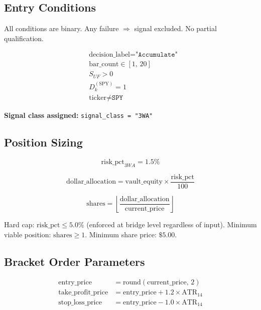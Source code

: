 \documentclass[11pt, a4paper]{article}
\begin{document}
\subsection{Entry Conditions}

All conditions are binary. Any failure $\Rightarrow$ signal excluded. No partial
qualification.

\begin{align}
  &\text{decision\_label} = \texttt{"Accumulate"} \label{eq:3wa-1}\\
  &\text{bar\_count} \in [1,\, 20] \label{eq:3wa-2}\\
  &S_{UF} > 0 \label{eq:3wa-3}\\
  &D_k^{(\text{SPY})} = 1 \label{eq:3wa-4}\\
  &\text{ticker} \neq \texttt{SPY} \label{eq:3wa-5}
\end{align}

\textbf{Signal class assigned:} \texttt{signal\_class = "3WA"}

\subsection{Position Sizing}

\begin{equation}
  \text{risk\_pct}_{3WA} = 1.5\%
\end{equation}

\begin{equation}
  \text{dollar\_allocation} = \text{vault\_equity} \times \frac{\text{risk\_pct}}{100}
\end{equation}

\begin{equation}
  \text{shares} = \left\lfloor \frac{\text{dollar\_allocation}}{\text{current\_price}} \right\rfloor
\end{equation}

Hard cap: $\text{risk\_pct} \leq 5.0\%$ (enforced at bridge level regardless of input).
Minimum viable position: $\text{shares} \geq 1$. Minimum share price: $\$5.00$.

\subsection{Bracket Order Parameters}

\begin{align}
  \text{entry\_price}       &= \text{round}(\text{current\_price},\, 2) \\
  \text{take\_profit\_price} &= \text{entry\_price} + 1.2 \times \text{ATR}_{14} \\
  \text{stop\_loss\_price}   &= \text{entry\_price} - 1.0 \times \text{ATR}_{14}
\end{align}
\end{document}
